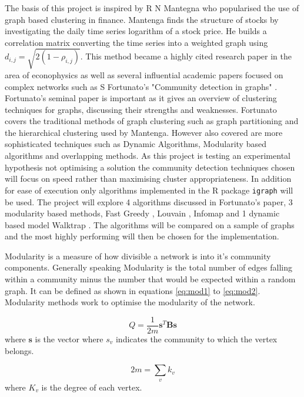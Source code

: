 The basis of this project is inspired by R N Mantegna  \cite{mantegna1999} who popularised the use of graph based clustering in finance. Mantenga finds the structure of stocks by investigating the daily time series logarithm of a stock price. He builds a correlation matrix converting the time series into a weighted graph using $d_{i,j}= \sqrt{2(1-\rho_{i,j})}$. This method became a highly cited research paper in the area of econophysics as well as several influential academic papers focused on complex networks such as S Fortunato's "Community detection in graphs" \cite{fortunato2010}. 
Fortunato's seminal paper is important as it gives an overview of clustering techniques for graphs, discussing their strengths and weaknesses. Fortunato covers the traditional methods of graph clustering such as graph partitioning and the hierarchical clustering used by Mantenga. However also covered are more sophisticated techniques such as Dynamic Algorithms, Modularity based algorithms and overlapping methods. As this project is testing an experimental hypothesis not optimising a solution the community detection techniques chosen will focus on speed rather than  maximising cluster appropriateness. In addition for ease of execution only algorithms implemented in the R package \texttt{igraph} will be used. The project will explore 4 algorithms discussed in Fortunato's paper, 3 modularity based methods, Fast Greedy \cite{clauset2004}, Louvain \cite{blondel2008}, Infomap \cite{rosvall2008} and 1 dynamic based model Walktrap \cite{pons2006}. The algorithms will be compared on a sample of graphs and the most highly performing will then be chosen for the implementation.

Modularity \cite{newman2006} is a measure of how divisible a network is into it's community components. Generally speaking Modularity is the total number of edges falling within a community minus the number that would be expected within a random graph. It can be defined as shown in equations \ref{eq:mod1} to \ref{eq:mod2}. Modularity methods work to optimise the modularity of the network.

\begin{equation}
\label{eq:mod1}
    Q=\frac{1}{2m}\mathbf{s}^T\mathbf{Bs}
\end{equation}
where $\mathbf{s}$ is the vector where $s_v$ indicates the community to which the vertex belongs.

\begin{equation}
    2m=\sum_v k_v
\end{equation}
where $K_v$ is the degree of each vertex.

